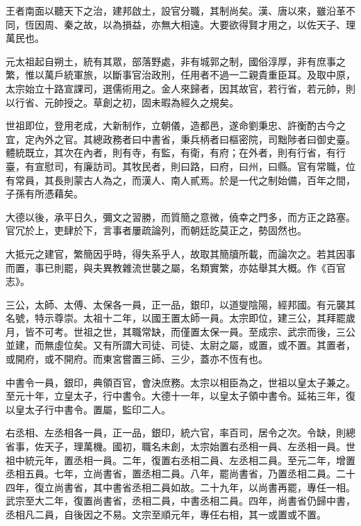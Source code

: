 
\begin{pinyinscope}

 王者南面以聽天下之治，建邦啟土，設官分職，其制尚矣。漢、唐以來，雖沿革不同，恆因周、秦之故，以為損益，亦無大相遠。大要欲得賢才用之，以佐天子、理萬民也。



 元太祖起自朔土，統有其眾，部落野處，非有城郭之制，國俗淳厚，非有庶事之繁，惟以萬戶統軍旅，以斷事官治政刑，任用者不過一二親貴重臣耳。及取中原，太宗始立十路宣課司，選儒術用之。金人來歸者，因其故官，若行省，若元帥，則以行省、元帥授之。草創之初，固未暇為經久之規矣。



 世祖即位，登用老成，大新制作，立朝儀，造都邑，遂命劉秉忠、許衡酌古今之宜，定內外之官。其總政務者曰中書省，秉兵柄者曰樞密院，司黜陟者曰御史臺。體統既立，其次在內者，則有寺，有監，有衛，有府；在外者，則有行省，有行臺，有宣慰司，有廉訪司。其牧民者，則曰路，曰府，曰州，曰縣。官有常職，位有常員，其長則蒙古人為之，而漢人、南人貳焉。於是一代之制始備，百年之間，子孫有所憑藉矣。



 大德以後，承平日久，彌文之習勝，而質簡之意微，僥幸之門多，而方正之路塞。官冗於上，吏肆於下，言事者屢疏論列，而朝廷訖莫正之，勢固然也。



 大抵元之建官，繁簡因乎時，得失系乎人，故取其簡牘所載，而論次之。若其因事而置，事已則罷，與夫異教雜流世襲之屬，名類實繁，亦姑舉其大概。作《百官志》。



 三公，太師、太傅、太保各一員，正一品，銀印，以道燮陰陽，經邦國。有元襲其名號，特示尊崇。太祖十二年，以國王置太師一員。太宗即位，建三公，其拜罷歲月，皆不可考。世祖之世，其職常缺，而僅置太保一員。至成宗、武宗而後，三公並建，而無虛位矣。又有所謂大司徒、司徒、太尉之屬，或置，或不置。其置者，或開府，或不開府。而東宮嘗置三師、三少，蓋亦不恆有也。



 中書令一員，銀印，典領百官，會決庶務。太宗以相臣為之，世祖以皇太子兼之。至元十年，立皇太子，行中書令。大德十一年，以皇太子領中書令。延祐三年，復以皇太子行中書令。置屬，監印二人。



 右丞相、左丞相各一員，正一品，銀印，統六官，率百司，居令之次。令缺，則總省事，佐天子，理萬機。國初，職名未創，太宗始置右丞相一員、左丞相一員。世祖中統元年，置丞相一員。二年，復置右丞相二員、左丞相二員。至元二年，增置丞相五員。七年，立尚書省，置丞相二員。八年，罷尚書省，乃置丞相二員。二十四年，復立尚書省，其中書省丞相二員如故。二十九年，以尚書再罷，專任一相。武宗至大二年，復置尚書省，丞相二員，中書丞相二員。四年，尚書省仍歸中書，丞相凡二員，自後因之不易。文宗至順元年，專任右相，其一或置或不置。




\end{pinyinscope}
